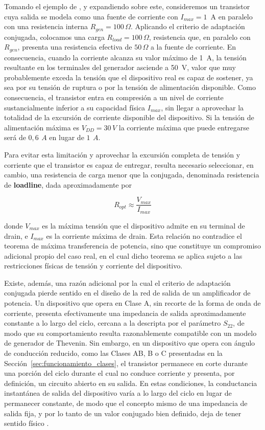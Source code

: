 Tomando el ejemplo de \cite[p.~12]{cripps2006}, y expandiendo sobre este, consideremos un transistor cuya salida se modela como una fuente de corriente con $I_{max}=1$~A en paralelo con una resistencia interna $R_{gen}=100\,\Omega$. Aplicando el criterio de adaptación conjugada, colocamos una carga $R_{load}=100\,\Omega$, resistencia que, en paralelo con $R_{gen}$, presenta una resistencia efectiva de $50\,\Omega$ a la fuente de corriente. En consecuencia, cuando la corriente alcanza su valor máximo de 1~A, la tensión resultante en los terminales del generador asciende a 50~V, valor que muy probablemente exceda la tensión que el dispositivo real es capaz de sostener, ya sea por su tensión de ruptura o por la tensión de alimentación disponible. Como consecuencia, el transistor entra en compresión a un nivel de corriente sustancialmente inferior a su capacidad física $I_{max}$, sin llegar a aprovechar la totalidad de la excursión de corriente disponible del dispositivo. Si la tensión de alimentación máxima es $V_{DD}=30\,V$ la corriente máxima que puede entregarse será de $0{,}6~\,A$ en lugar de $1~\,A$.

Para evitar esta limitación y aprovechar la excursión completa de tensión y corriente que el transistor es capaz de entregar, resulta necesario seleccionar, en cambio, una resistencia de carga menor que la conjugada, denominada resistencia de \textbf{loadline}, dada aproximadamente por

\begin{equation}
    R_{opt} \approx \frac{V_{max}}{I_{max}}
    \label{eq:rl_optima}
\end{equation}

donde $V_{max}$ es la máxima tensión que el dispositivo admite en su terminal de drain, e $I_{max}$ es la corriente máxima de drain. Esta relación no contradice el teorema de máxima transferencia de potencia, sino que constituye un compromiso adicional propio del caso real, en el cual dicho teorema se aplica sujeto a las restricciones físicas de tensión y corriente del dispositivo.

Existe, además, una razón adicional por la cual el criterio de adaptación conjugada pierde sentido en el diseño de la red de salida de un amplificador de potencia. Un dispositivo que opera en Clase A, sin recorte de la forma de onda de corriente, presenta efectivamente una impedancia de salida aproximadamente constante a lo largo del ciclo, cercana a la descripta por el parámetro $S_{22}$, de modo que su comportamiento resulta razonablemente compatible con un modelo de generador de Thevenin. Sin embargo, en un dispositivo que opera con ángulo de conducción reducido, como las Clases AB, B o C presentadas en la Sección~\ref{sec:funcionamiento_clases}, el transistor permanece en corte durante una porción del ciclo durante el cual no conduce corriente y presenta, por definición, un circuito abierto en su salida. En estas condiciones, la conductancia instantánea de salida del dispositivo varía a lo largo del ciclo en lugar de permanecer constante, de modo que el concepto mismo de una impedancia de salida fija, y por lo tanto de un valor conjugado bien definido, deja de tener sentido físico \cite[p.~13]{cripps2006}.

